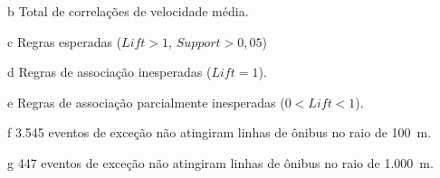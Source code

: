 \documentclass{beamer}
\begin{document}
\begin{frame}
\begin{table}[!htb]
\begin{adjustbox}{max height=10mm, width=3in}
\begin{threeparttable}
\begin{tablenotes}
            \item[b] Total de correlações de velocidade média.
            \item[c] Regras esperadas ($Lift > 1$, $Support > 0,05$)
            \item[d] Regras de associação inesperadas ($Lift = 1$).
            \item[e] Regras de associação parcialmente inesperadas ($0 < Lift < 1$).
            \item[f] 3.545 eventos de exceção não atingiram linhas de ônibus no raio de 100~m.
            \item[g] 447 eventos de exceção não atingiram linhas de ônibus no raio de 1.000~m.
        \end{tablenotes}
\end{threeparttable}
\end{adjustbox}
\end{table}
\end{frame}
\end{document}
